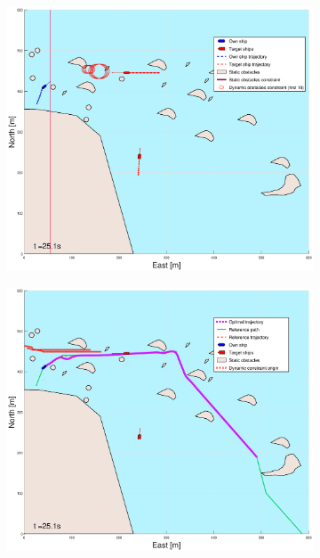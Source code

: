\clearpage
\begin{figure}[!b] %
    \begin{subfigure}[b]{0.49\textwidth}
        \centering
        \includegraphics[width=\textwidth]{Images/Figures/skjergard_m_trafikk_NEW/_Simple_0fig1_time=25}
    \end{subfigure}
    \hfill
    \begin{subfigure}[b]{0.499\textwidth}
        \centering
        \includegraphics[width=\textwidth]{Images/Figures/skjergard_m_trafikk_NEW/_Simple_0fig999_time=25}

\end{subfigure}
\end{figure}

